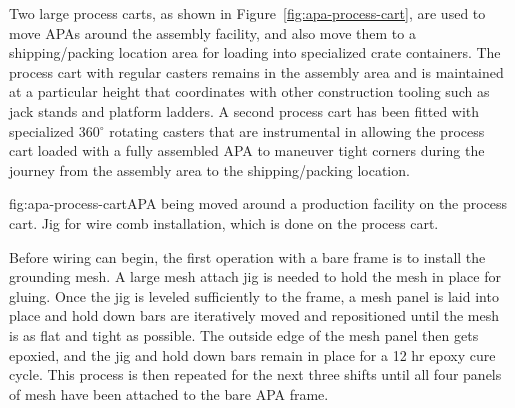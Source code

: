 Two large process carts, as shown in Figure~\ref{fig:apa-process-cart}, are used to move APAs around the assembly facility, and also move them to a shipping/packing location area for loading into specialized crate containers. The process cart with regular casters remains in the assembly area and is maintained at a particular height that coordinates with other construction tooling such as jack stands and platform ladders. A second process cart has been fitted with specialized 360$^\circ$ rotating casters that are instrumental in allowing the process cart loaded with a fully assembled APA to maneuver tight corners during the journey from the assembly area to the shipping/packing location.

\begin{dunefigure}{fig:apa-process-cart}{APA being moved around a production facility on the process cart. Jig for wire comb installation, which is done on the process cart.}
\setlength{\fboxsep}{0pt}
\setlength{\fboxrule}{0.5pt}
\end{dunefigure}

Before wiring can begin, the first operation with a bare frame is to install the grounding mesh. %
A large mesh attach jig is needed to hold the mesh in place for gluing. Once the jig is leveled sufficiently to the frame, a mesh panel is laid into place and hold down bars are iteratively moved and repositioned until the mesh is as flat and tight as possible.  The outside edge of the mesh panel then gets epoxied, and the jig and hold down bars remain in place for a 12 hr epoxy cure cycle.  This process is then repeated for the next three shifts until all four panels of mesh have been attached to the bare APA frame.  %

